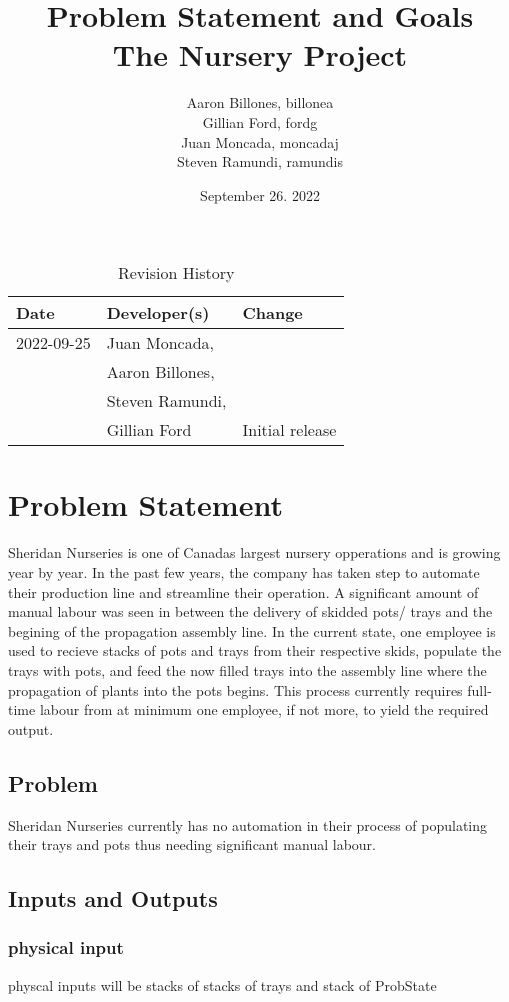 \documentclass{article}
\title{Problem Statement and Goals\\The Nursery Project}
\author{Aaron Billones, billonea\\Gillian Ford, fordg\\Juan Moncada, moncadaj\\Steven Ramundi, ramundis}
\date{September 26. 2022}
\begin{document}
\maketitle

\begin{table}[hp]
\caption{Revision History} \label{TblRevisionHistory}
\begin{tabularx}{\textwidth}{llX}
\toprule
\textbf{Date} & \textbf{Developer(s)} & \textbf{Change}\\
\midrule
2022-09-25 & Juan Moncada,\\&Aaron Billones,\\&Steven Ramundi,\\&Gillian Ford & Initial release\\
 
\bottomrule
\end{tabularx}
\end{table}

\section{Problem Statement}

Sheridan Nurseries is one of Canadas largest nursery opperations and is growing year by year.
In the past few years, the company has taken step to automate their production line and streamline their operation.
A significant amount of manual labour was seen in between the delivery of skidded pots/ trays and the begining of the propagation 
assembly line. In the current state, one employee is used to recieve stacks of pots and trays from their respective skids,
populate the trays with pots, and feed the now filled trays into the assembly line where the propagation of plants into the pots begins.
This process currently requires full-time labour from at minimum one employee, if not more, to yield the required output.

\subsection{Problem}
Sheridan Nurseries currently has no automation in their process of populating their trays and pots thus needing significant manual labour.

\subsection{Inputs and Outputs}
\subsubsection{physical input}
physcal inputs will be stacks of stacks of trays and stack of ProbState
\end{document}
